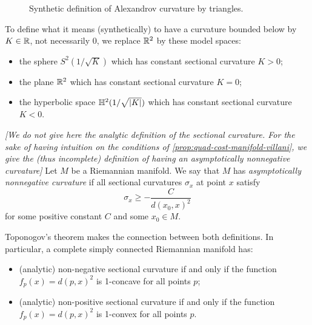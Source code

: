 \begin{figure}[h]
    \centering
    \caption{Synthetic definition of Alexandrov curvature by triangles.}
\end{figure}
To define what it means (synthetically) to have a curvature bounded below by $K\in\mathbb{R}$, not necessarily 0, we replace $\mathbb{R}^2$ by these model spaces:
\begin{itemize}[nolistsep]
    \item the sphere $S^2(1/\sqrt{K})$ which has constant sectional curvature $K>0$;
    \item the plane $\mathbb{R}^2$ which has constant sectional curvature $K=0$;
    \item the hyperbolic space $\mathbb{H}^2(1/\sqrt{|K|})$ which has constant sectional curvature $K<0$.
\end{itemize}
\begin{defi}
    \textit{[We do not give here the analytic definition of the sectional curvature. For the sake of having intuition on the conditions of \cref{prop:quad-cost-manifold-villani}, we give the (thus incomplete) definition of having an \emph{asymptotically nonnegative curvature}]}
    Let $M$ be a Riemannian manifold. We say that $M$ has \emph{asymptotically nonnegative curvature} if all sectional curvatures $\sigma_{x}$ at point $x$ satisfy $$\sigma_{x}\geq -\frac{C}{d(x_{0},x)^{2}}$$ for some positive constant $C$ and some $x_{0}\in M$.
\end{defi}
Toponogov's theorem makes the connection between both definitions. In particular, a complete simply connected Riemannian manifold has:
\begin{itemize}[nolistsep]
    \item (analytic) non-negative sectional curvature if and only if the function $f_{p}(x)=d(p,x)^2$ is 1-concave for all points $p$;
    \item (analytic) non-positive sectional curvature if and only if the function $f_{p}(x)=d(p,x)^2$ is 1-convex for all points $p$.
\end{itemize}



